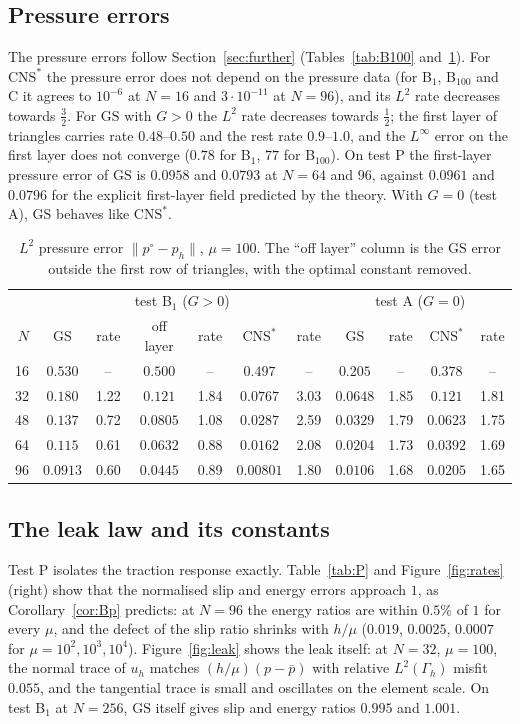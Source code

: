 \documentclass[pdflatex,sn-mathphys-num]{sn-jnl}
\theoremstyle{thmstyleone}
\theoremstyle{thmstylethree}
\newcommand{\Gh}{\Gamma_h}
\newcommand{\pbar}{\bar p}
\newcommand{\norm}[1]{\lVert #1\rVert}
\newcommand{\GS}{\mathrm{GS}}
\newcommand{\CNS}{\mathrm{CNS}^\ast}
\begin{document}
\subsection{Pressure errors}
The pressure errors follow Section~\ref{sec:further} (Tables~\ref{tab:B100} and~\ref{tab:pB1}). For $\CNS$ the pressure error does not depend on the pressure data (for B$_1$, B$_{100}$ and C it agrees to $10^{-6}$ at $N=16$ and $3\cdot10^{-11}$ at $N=96$), and its $L^2$ rate decreases towards $\frac32$. For $\GS$ with $G>0$ the $L^2$ rate decreases towards $\frac12$; the first layer of triangles carries rate $0.48$--$0.50$ and the rest rate $0.9$--$1.0$, and the $L^\infty$ error on the first layer does not converge ($0.78$ for B$_1$, $77$ for B$_{100}$). On test P the first-layer pressure error of $\GS$ is $0.0958$ and $0.0793$ at $N=64$ and $96$, against $0.0961$ and $0.0796$ for the explicit first-layer field predicted by the theory. With $G=0$ (test A), $\GS$ behaves like $\CNS$.

\begin{table}[t]
\centering\small
\caption{$L^2$ pressure error $\norm{p^\circ-p_h}$, $\mu=100$. The ``off layer'' column is the $\GS$ error outside the first row of triangles, with the optimal constant removed.}\label{tab:pB1}
\begin{tabular}{rcccccc|cccc}
\toprule
 & \multicolumn{6}{c|}{test B$_1$ ($G>0$)} & \multicolumn{4}{c}{test A ($G=0$)}\\
$N$ & $\GS$ & rate & off layer & rate & $\CNS$ & rate & $\GS$ & rate & $\CNS$ & rate\\
\midrule
16 & $0.530$ & -- & $0.500$ & -- & $0.497$ & -- & $0.205$ & -- & $0.378$ & --\\
32 & $0.180$ & 1.22 & $0.121$ & 1.84 & $0.0767$ & 3.03 & $0.0648$ & 1.85 & $0.121$ & 1.81\\
48 & $0.137$ & 0.72 & $0.0805$ & 1.08 & $0.0287$ & 2.59 & $0.0329$ & 1.79 & $0.0623$ & 1.75\\
64 & $0.115$ & 0.61 & $0.0632$ & 0.88 & $0.0162$ & 2.08 & $0.0204$ & 1.73 & $0.0392$ & 1.69\\
96 & $0.0913$ & 0.60 & $0.0445$ & 0.89 & $0.00801$ & 1.80 & $0.0106$ & 1.68 & $0.0205$ & 1.65\\
\bottomrule
\end{tabular}
\end{table}

\subsection{The leak law and its constants}
Test P isolates the traction response exactly. Table~\ref{tab:P} and Figure~\ref{fig:rates} (right) show that the normalised slip and energy errors approach $1$, as Corollary~\ref{cor:Bp} predicts: at $N=96$ the energy ratios are within $0.5\%$ of $1$ for every $\mu$, and the defect of the slip ratio shrinks with $h/\mu$ ($0.019$, $0.0025$, $0.0007$ for $\mu=10^2,10^3,10^4$). Figure~\ref{fig:leak} shows the leak itself: at $N=32$, $\mu=100$, the normal trace of $u_h$ matches $(h/\mu)(p-\pbar)$ with relative $L^2(\Gh)$ misfit $0.055$, and the tangential trace is small and oscillates on the element scale. On test B$_1$ at $N=256$, $\GS$ itself gives slip and energy ratios $0.995$ and $1.001$.
\end{document}
